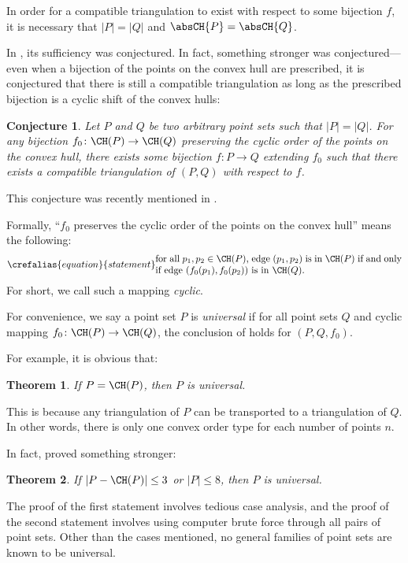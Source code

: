 \documentclass{article}
\let\Cref\crtCref
\theoremstyle{plain}
\newtheorem{theorem}       {Theorem}    [section]
\newtheorem{conjecture}       {Conjecture}    [section]
\begin{document}
In order for a compatible triangulation to exist
with respect to some bijection $f$,
it is necessary that $|P| = |Q|$ and $\absCH{P} = \absCH{Q}$.

In \cite{Aichholzer_2003}, its sufficiency was conjectured.
In fact, something stronger was conjectured---even when a bijection of the points on the convex hull are prescribed, it is conjectured that there is still a compatible triangulation as long as the prescribed bijection is a cyclic shift of the convex hulls:
\begin{conjecture}\label{conjecture:main}
	Let $P$ and $Q$ be two arbitrary point sets such that $|P|=|Q|$.
	For any bijection $f_0 \colon \CH(P) \to \CH(Q)$
	preserving the cyclic order of the points on the convex hull,
	there exists some bijection $f \colon P \to Q$ extending $f_0$
	such that there exists a compatible triangulation of $(P, Q)$
	with respect to $f$.
\end{conjecture}

This conjecture was recently mentioned in \cite{o2018open}.

\label{def_cyclic}
Formally, ``$f_0$ preserves the cyclic order of the points on the convex hull'' means the following:
\begin{equation}
	\crefalias{equation}{statement}
	\label{statement_cyclic}
	\text{\parbox{0.75\textwidth}{
			for all $p_1, p_2 \in\CH(P)$, edge $(p_1,p_2)$ is in $\CH(P)$ if and only if edge $(f_0(p_1), f_0(p_2))$ is in $\CH(Q)$.
	}}
\end{equation}
For short, we call such a mapping \emph{cyclic}.

\label{def_universal}
For convenience, we say a point set $P$ is \emph{universal}
if for all point sets $Q$ and cyclic mapping $f_0 \colon \CH(P) \to \CH(Q)$,
the conclusion of \Cref{conjecture:main} holds for $(P, Q, f_0)$.

For example, it is obvious that:
\begin{theorem}
	If $P =\CH(P)$, then $P$ is universal.
\end{theorem}
This is because any triangulation of $P$ can be transported to a triangulation of $Q$. In other words, there is only one convex order type for each number of points $n$.

In fact, \cite{Aichholzer_2003} proved something stronger:
\begin{theorem}
	If $|P-\CH(P)|\leq 3$ or $|P|\leq 8$, then $P$ is universal.
\end{theorem}
The proof of the first statement involves tedious case analysis,
and the proof of the second statement involves using computer brute force through all pairs of point sets.
Other than the cases mentioned, no general families of point sets are known to be universal.
\end{document}
